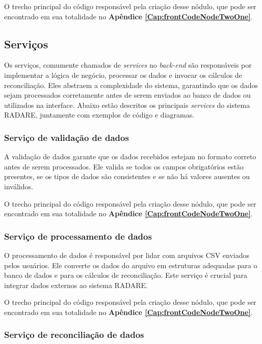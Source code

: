 O trecho principal do código responsável pela criação desse nódulo, que pode ser encontrado em sua totalidade no \textbf{Apêndice \ref{Cap:frontCodeNodeTwoOne}}.

\subsection{Serviços}

Os serviços, comumente chamados de \textit{services} no \textit{back-end} são responsáveis por implementar a lógica de negócio, processar os dados e invocar os cálculos de reconciliação. Eles abstraem a complexidade do sistema, garantindo que os dados sejam processados corretamente antes de serem enviados ao banco de dados ou utilizados na interface. Abaixo estão descritos os principais \textit{services} do sistema RADARE, juntamente com exemplos de código e diagramas.



\subsubsection{Serviço de validação de dados}

A validação de dados garante que os dados recebidos estejam no formato correto antes de serem processados. Ele valida se todos os campos obrigatórios estão presentes, se os tipos de dados são consistentes e se não há valores ausentes ou inválidos.

O trecho principal do código responsável pela criação desse nódulo, que pode ser encontrado em sua totalidade no \textbf{Apêndice \ref{Cap:frontCodeNodeTwoOne}}.

\subsubsection{Serviço de processamento de dados}

O processamento de dados é responsável por lidar com arquivos CSV enviados pelos usuários. Ele converte os dados do arquivo em estruturas adequadas para o banco de dados e para os cálculos de reconciliação. Este serviço é crucial para integrar dados externos ao sistema RADARE.

O trecho principal do código responsável pela criação desse nódulo, que pode ser encontrado em sua totalidade no \textbf{Apêndice \ref{Cap:frontCodeNodeTwoOne}}.

\subsubsection{Serviço de reconciliação de dados}

